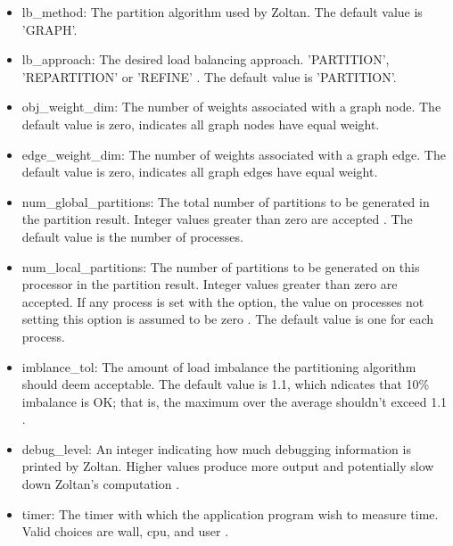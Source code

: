 \begin{itemize}

\item{lb\_method:} The partition algorithm used by Zoltan. The default
  value is 'GRAPH'.

\item{lb\_approach:} The desired load balancing approach. 'PARTITION',
  'REPARTITION' or 'REFINE' \cite{Zoltan}. The default value is 'PARTITION'.  

\item obj\_weight\_dim: The number of weights associated with a graph
  node. The default value is zero, indicates all graph nodes have
  equal weight.  

\item edge\_weight\_dim: The number of weights associated with a graph
  edge. The default value is zero, indicates all graph edges have
  equal weight. 

\item num\_global\_partitions:   The total number of partitions to be
  generated in the partition result. Integer values greater than zero
  are accepted \cite{Zoltan}. The default value is the number of processes. 

\item num\_local\_partitions: 
  The number of partitions to be generated on this processor in the
  partition result. Integer values greater than zero
  are accepted. If any process is set with the option, the value on
  processes not setting this option is assumed to be zero \cite{Zoltan}. The
  default value is one for each process.   

\item imblance\_tol: The amount of load imbalance the partitioning
  algorithm should deem acceptable. The default value is 1.1, which
  ndicates that 10\% imbalance is OK; that is, the maximum over the
  average shouldn't exceed 1.1  \cite{Zoltan}.    

\item debug\_level: An integer indicating how much debugging
  information is printed by Zoltan. Higher values produce more output
  and potentially slow down Zoltan's computation \cite{Zoltan}. 

\item timer: The timer with which the application program wish to measure time. Valid
  choices are wall, cpu, and user  \cite{Zoltan}. 


\end{itemize}


